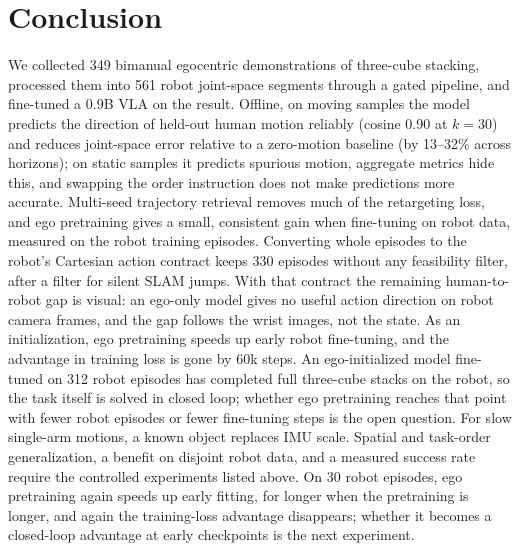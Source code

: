 \documentclass[conference,10pt]{IEEEtran}
\begin{document}
\section{Conclusion}
We collected 349 bimanual egocentric demonstrations of three-cube stacking, processed them into 561 robot joint-space segments
through a gated pipeline, and fine-tuned a 0.9B VLA on the result. Offline, on moving samples the model predicts the
direction of held-out human motion reliably (cosine 0.90 at $k{=}30$) and reduces joint-space error relative to a zero-motion
baseline (by 13--32\% across horizons); on static samples it predicts spurious motion, aggregate metrics hide this, and
swapping the order instruction does not make predictions more accurate. Multi-seed trajectory retrieval removes much of the
retargeting loss, and ego pretraining gives a small, consistent gain when fine-tuning on robot data, measured on the robot
training episodes. Converting whole episodes to the robot's Cartesian action contract keeps 330 episodes without any
feasibility filter, after a filter for silent SLAM jumps. With that contract the remaining human-to-robot gap is visual: an
ego-only model gives no useful action direction on robot camera frames, and the gap follows the wrist images, not the state.
As an initialization, ego pretraining speeds up early robot fine-tuning, and the advantage in training loss is gone by
60k steps. An ego-initialized model fine-tuned on 312 robot episodes has completed full three-cube stacks on the robot, so
the task itself is solved in closed loop; whether ego pretraining reaches that point with fewer robot episodes or fewer
fine-tuning steps is the open question. For slow single-arm motions, a known object replaces IMU scale. Spatial and
task-order generalization, a benefit on disjoint robot data, and a measured success rate require the controlled
experiments listed above. On 30 robot episodes, ego pretraining again speeds up early fitting, for longer when the
pretraining is longer, and again the training-loss advantage disappears; whether it becomes a closed-loop advantage at early
checkpoints is the next experiment.
\end{document}
